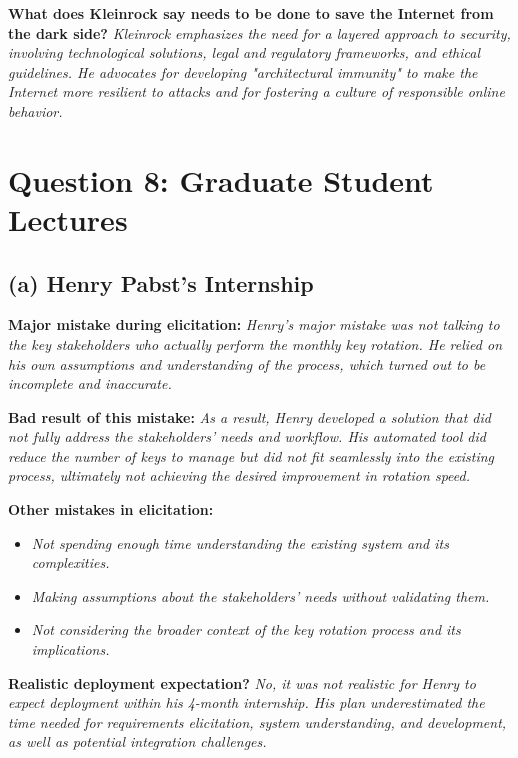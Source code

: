 \documentclass{article}
\begin{document}
\textbf{What does Kleinrock say needs to be done to save the Internet from the dark side?} \textit{Kleinrock emphasizes the need for a layered approach to security, involving technological solutions, legal and regulatory frameworks, and ethical guidelines. He advocates for developing "architectural immunity" to make the Internet more resilient to attacks and for fostering a culture of responsible online behavior.}



\section*{Question 8: Graduate Student Lectures}

\subsection*{(a) Henry Pabst's Internship}

\textbf{Major mistake during elicitation:} \textit{Henry's major mistake was not talking to the key stakeholders who actually perform the monthly key rotation. He relied on his own assumptions and understanding of the process, which turned out to be incomplete and inaccurate.}

\textbf{Bad result of this mistake:} \textit{As a result, Henry developed a solution that did not fully address the stakeholders' needs and workflow. His automated tool did reduce the number of keys to manage but did not fit seamlessly into the existing process, ultimately not achieving the desired improvement in rotation speed.}

\textbf{Other mistakes in elicitation:}
\begin{itemize}
    \item \textit{Not spending enough time understanding the existing system and its complexities.}
    \item \textit{Making assumptions about the stakeholders' needs without validating them.}
    \item \textit{Not considering the broader context of the key rotation process and its implications.}
\end{itemize}

\textbf{Realistic deployment expectation?} \textit{No, it was not realistic for Henry to expect deployment within his 4-month internship. His plan underestimated the time needed for requirements elicitation, system understanding, and development, as well as potential integration challenges.}
\end{document}
